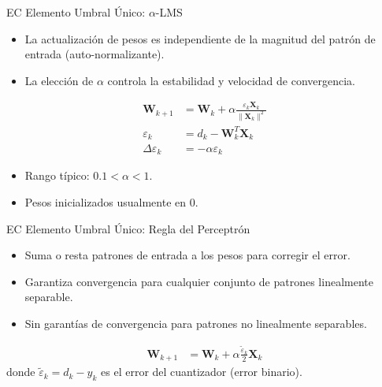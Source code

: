 \documentclass[aspectratio=169,utf8,spanish]{beamer}
\begin{document}
\begin{frame}{EC Elemento Umbral Único: $\alpha$-LMS}
  \begin{itemize}
    \item La actualización de pesos es independiente de la magnitud del patrón de entrada (auto-normalizante).
    \item La elección de $\alpha$ controla la estabilidad y velocidad de convergencia.
  \end{itemize}
  \begin{align*}
    \mathbf{W}_{k+1} &= \mathbf{W}_k + \alpha \frac{\varepsilon_k \mathbf{X}_k}{\|\mathbf{X}_k\|^2} \\[4pt]
    \varepsilon_k &= d_k - \mathbf{W}_k^T \mathbf{X}_k \\[4pt]
    \Delta\varepsilon_k &= -\alpha\varepsilon_k
  \end{align*}
  \begin{itemize}
    \item Rango típico: $0.1 < \alpha < 1$.
    \item Pesos inicializados usualmente en $0$.
  \end{itemize}
\end{frame}

\begin{frame}{EC Elemento Umbral Único: Regla del Perceptrón}
  \begin{itemize}
    \item Suma o resta patrones de entrada a los pesos para corregir el error.
    \item Garantiza convergencia para cualquier conjunto de patrones linealmente separable.
    \item Sin garantías de convergencia para patrones no linealmente separables.
  \end{itemize}
  \begin{align*}
    \mathbf{W}_{k+1} &= \mathbf{W}_k + \alpha \frac{\tilde{\varepsilon}_k}{2} \mathbf{X}_k
  \end{align*}
  donde $\tilde{\varepsilon}_k = d_k - y_k$ es el error del cuantizador (error binario).
\end{frame}
\end{document}
